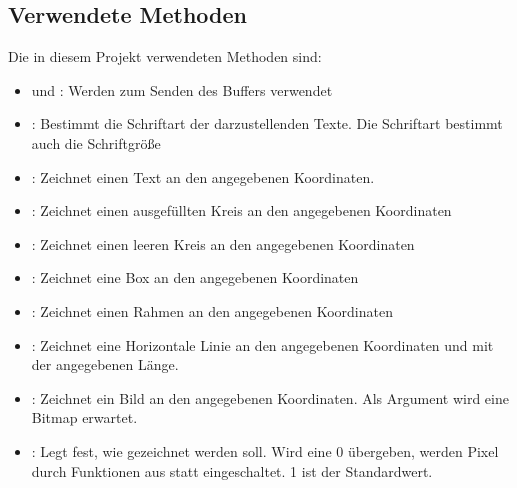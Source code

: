 \documentclass[letterpaper,10pt,ngerman]{sphinxmanual}
\begin{document}
\subsection{Verwendete Methoden}
\label{\detokenize{programming:verwendete-methoden}}
Die in diesem Projekt verwendeten Methoden sind:
\begin{itemize}
\item {} 
 und : Werden zum Senden des Buffers verwendet

\item {} 
: Bestimmt die Schriftart der darzustellenden Texte. Die
Schriftart bestimmt auch die Schriftgröße

\item {} 
: Zeichnet einen Text an den angegebenen Koordinaten.

\item {} 
: Zeichnet einen ausgefüllten Kreis an den angegebenen
Koordinaten

\item {} 
: Zeichnet einen leeren Kreis an den angegebenen Koordinaten

\item {} 
: Zeichnet eine Box an den angegebenen Koordinaten

\item {} 
: Zeichnet einen Rahmen an den angegebenen Koordinaten

\item {} 
: Zeichnet eine Horizontale Linie an den angegebenen
Koordinaten und mit der angegebenen Länge.

\item {} 
: Zeichnet ein Bild an den angegebenen Koordinaten. Als Argument
wird eine Bitmap erwartet.

\item {} 
: Legt fest, wie gezeichnet werden soll. Wird eine 0
übergeben, werden Pixel durch  Funktionen aus\sphinxhyphen{} statt eingeschaltet.
1 ist der Standardwert.

\end{itemize}
\end{document}
